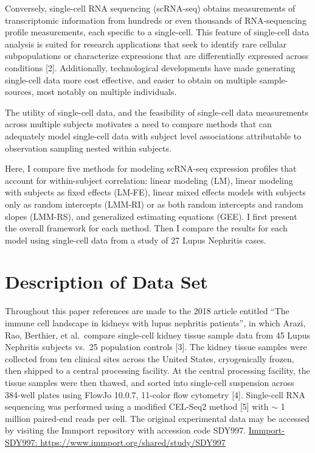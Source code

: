 \documentclass[12pt,]{article}
\begin{document}
Conversely, single-cell RNA sequencing (scRNA-seq) obtains measurements
of transcriptomic information from hundreds or even thousands of
RNA-sequencing profile measurements, each specific to a single-cell.
This feature of single-cell data analysis is suited for research
applications that seek to identify rare cellular subpopulations or
characterize expressions that are differentially expressed across
conditions {[}2{]}. Additionally, technological developments have made
generating single-cell data more cost effective, and easier to obtain on
multiple sample-sources, most notably on multiple individuals.

The utility of single-cell data, and the feasibility of single-cell data
measurements across multiple subjects motivates a need to compare
methods that can adequately model single-cell data with subject level
associations attributable to observation sampling nested within
subjects.

Here, I compare five methods for modeling scRNA-seq expression profiles
that account for within-subject correlation: linear modeling (LM),
linear modeling with subjects as fixed effects (LM-FE), linear mixed
effects models with subjects only as random intercepts (LMM-RI) or as
both random intercepts and random slopes (LMM-RS), and generalized
estimating equations (GEE). I first present the overall framework for
each method. Then I compare the results for each model using single-cell
data from a study of 27 Lupus Nephritis cases.

\hypertarget{description-of-data-set}{%
\section{Description of Data Set}\label{description-of-data-set}}

Throughout this paper references are made to the 2018 article entitled
``The immune cell landscape in kidneys with lupus nephritis patients'',
in which Arazi, Rao, Berthier, et al.~compare single-cell kidney tissue
sample data from 45 Lupus Nephritis subjects vs.~25 population controls
{[}3{]}. The kidney tissue samples were collected from ten clinical
sites across the United States, cryogenically frozen, then shipped to a
central processing facility. At the central processing facility, the
tissue samples were then thawed, and sorted into single-cell suspension
across 384-well plates using FlowJo 10.0.7, 11-color flow cytometry
{[}4{]}. Single-cell RNA sequencing was performed using a modified
CEL-Seq2 method {[}5{]} with \(\sim\) 1 million paired-end reads per
cell. The original experimental data may be accessed by visiting the
Immport repository with accession code SDY997.
\href{https://www.immport.org/shared/study/SDY997}{Immport-SDY997:
https://www.immport.org/shared/study/SDY997}
\end{document}
